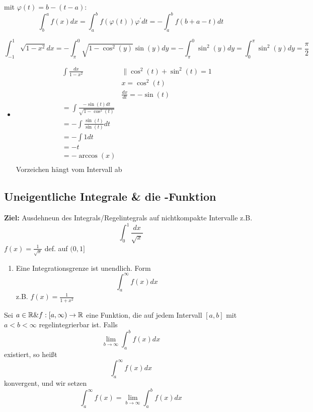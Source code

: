 \begin{subexample*}
	mit $ \varphi(t) = b - ( t - a ) $:
	\[
		\int_{b}^{a}f(x) dx = \int_{a}^{b} f(\varphi(t)) \varphi^{\prime} dt = - \int_{a}^{b} f( b + a - t ) dt
	\]
\end{subexample*}

\[
	\int_{-1}^{1} \sqrt{1 - x^2} dx = - \int_{\pi }^{0} \sqrt{1 - \cos ^2 (y)} \sin (y) dy = - \int_{\pi }^{0} \sin ^2(y)dy = \int_{0}^{\pi }\sin ^2 (y) dy = \frac{ \pi }{ 2 } 
\]

\begin{itemize}
	\item 
		\begin{align*}
			\int \frac{dx}{ 1 - x^2 } \quad &\| \cos ^2(t) + \sin ^2(t) = 1 \\
			~& x = \cos ^2(t)\\
			~& \frac{ dx }{ dt } = - \sin (t) \\
			= \int \frac{ - \sin (t) dt }{ \sqrt{1 - \cos ^2 (t)}  } &~\\
			= - \int \frac{ \sin (t) }{ \sin (t) } dt &~\\
			= - \int 1 dt &	~\\
			= - t &~\\
			= - \arccos (x) &~\\
		\end{align*}
		Vorzeichen hängt vom Intervall ab
\end{itemize}

\subsection{Uneigentliche Integrale \& die -Funktion}
\textbf{Ziel:} Ausdehneun des Integrals/Regelintegrals auf nichtkompakte Intervalle z.B.
\[
	\int_{0}^{1} \frac{ dx }{ \sqrt{x}  } 
\]
$ f(x) = \frac{ 1 }{ \sqrt{x}  }  $ def. auf $ (0, 1] $

\begin{enumerate}[label=(\Alph*)]
	\item Eine Integrationsgrenze ist unendlich. Form
		\[
			 \int_{a}^{\infty} f(x) dx
		\]
		z.B. $ f(x) = \frac{ 1 }{ 1 + x^2 }  $
\end{enumerate}

\begin{subdefinition}
	Sei $  a \in \mathbb{R} \& f: [a, \infty) \to \mathbb{R}  $ eine Funktion, die auf jedem Intervall $ [a, b] $ mit $ a < b < \infty $ regelintegrierbar ist. Falls 
	\[
		\lim_{b \to \infty} \int_{a}^{b} f(x) dx
	\]
	existiert, so heißt
	\[
		\int_{a}^{\infty}f(x) dx
	\]
	konvergent, und wir setzen
	\[
		\int_{a}^{\infty} f(x) = \lim_{b \to \infty} \int_{a}^{b}f(x)dx
	\]
	
\end{subdefinition}

